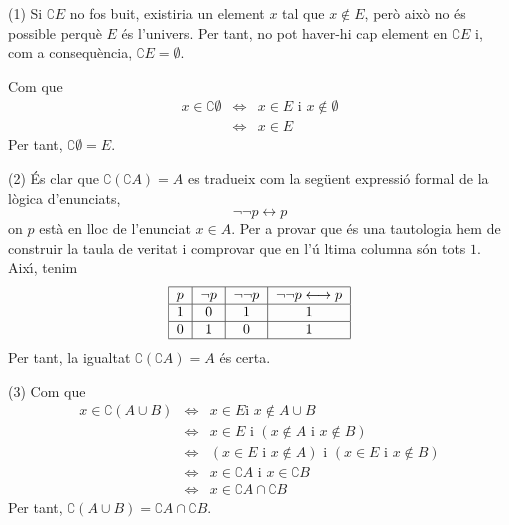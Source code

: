 \begin{solucio}
(1) Si $\complement E$ no fos buit, existiria un element $x$ tal que $%
x\notin E$, per\`{o} aix\`{o} no \'{e}s possible perqu\`{e} $E$ \'{e}s
l'univers. Per tant, no pot haver-hi cap element en $\complement E$ i, com a
consequ\`{e}ncia, $\complement E=\emptyset $.

Com que%
\begin{equation*}
\begin{array}{lll}
x\in \complement \emptyset & \Longleftrightarrow & x\in E\text{ i }x\notin
\emptyset \\
& \Longleftrightarrow & x\in E%
\end{array}%
\end{equation*}%
Per tant, $\complement \emptyset =E$.

(2) \'{E}s clar que $\complement \left( \complement A\right) =A$ es tradueix
com la seg\"{u}ent expressi\'{o} formal de la l\`{o}gica d'enunciats,%
\begin{equation*}
\lnot \lnot p\longleftrightarrow p
\end{equation*}%
on $p$ est\`{a} en lloc de l'enunciat $x\in A$. Per a provar que \'{e}s una
tautologia hem de construir la taula de veritat i comprovar que en l'\'{u}%
ltima columna s\'{o}n tots $1$. Aix\'{\i}, tenim%
\begin{equation*}
\begin{tabular}{|c|c|c|c|}
\hline
$p$ & $\lnot p$ & $\lnot \lnot p$ & $\lnot \lnot p\longleftrightarrow p$ \\
\hline
$1$ & $0$ & $1$ & $1$ \\ \hline
$0$ & $1$ & $0$ & $1$ \\ \hline
\end{tabular}%
\end{equation*}%
Per tant, la igualtat $\complement \left( \complement A\right) =A$ \'{e}s
certa.

(3) Com que%
\begin{equation*}
\begin{array}{lll}
x\in \complement \left( A\cup B\right) & \Longleftrightarrow & x\in E\text{
i }x\notin A\cup B \\
& \Longleftrightarrow & x\in E\text{ i }\left( x\notin A\text{ i }x\notin
B\right) \\
& \Longleftrightarrow & \left( x\in E\text{ i }x\notin A\right) \text{ i }%
\left( x\in E\text{ i }x\notin B\right) \\
& \Longleftrightarrow & x\in \complement A\text{ i }x\in \complement B \\
& \Longleftrightarrow & x\in \complement A\cap \complement B%
\end{array}%
\end{equation*}%
Per tant, $\complement \left( A\cup B\right) =\complement A\cap \complement
B $.


\end{solucio}
